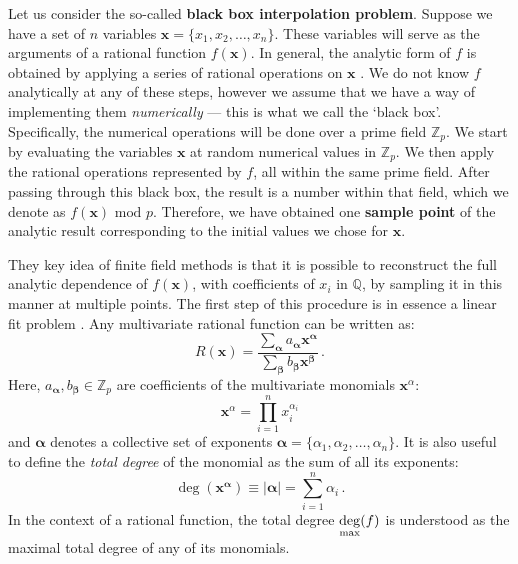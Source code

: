\documentclass[main.tex]{subfiles}
\begin{document}
Let us consider the so-called \textbf{black box interpolation problem}. Suppose we have a set of $n$ variables $\mathbf{x}=\{x_1, x_2, \ldots, x_n\}$. These variables will serve as the arguments of a rational function $f(\mathbf{x})$. In general, the analytic form of $f$ is obtained by applying a series of rational operations on $\mathbf{x}$ . We do not know $f$ analytically at any of these steps, however we assume that we have a way of implementing them \textit{numerically} --- this is what we call the `black box'. Specifically, the numerical operations will be done over a prime field $\mathbb{Z}_p$. We start by evaluating the variables $\mathbf{x}$ at random numerical values in $\mathbb{Z}_p$. We then apply the rational operations represented by $f$, all within the same prime field. After passing through this black box, the result is a number within that field, which we denote as $f(\mathbf{x}) \text{ mod } p$. Therefore, we have obtained one \textbf{sample point} of the analytic result corresponding to the initial values we chose for $\mathbf{x}$.

They key idea of finite field methods is that it is possible to reconstruct the full analytic dependence of $f(\mathbf{x})$, with coefficients of $x_i$ in $\mathbb{Q}$, by sampling it in this manner at multiple points. The first step of this procedure is in essence a linear fit problem . Any multivariate rational function can be written as:
\begin{equation} \label{eq:ratfun}
     R(\mathbf{x}) = \frac{
     \sum_{\bm{\alpha}} a_{\bm{\alpha}} \mathbf{x}^{\bm{\alpha}}
     }{
     \sum_{\bm{\beta}} b_{\bm{\beta}} \mathbf{x}^{\bm{\beta}}
     }\,.
\end{equation}
Here, $a_{\bm{\alpha}}, b_{\bm{\beta}} \in \mathbb{Z}_p$ are coefficients of the multivariate monomials $\mathbf{x}^\alpha$:
\begin{equation}
    \mathbf{x}^\alpha = \prod_{i=1}^n x_i^{\alpha_i}
\end{equation}
and $\bm{\alpha}$ denotes a collective set of exponents $\bm{\alpha} = \{\alpha_1, \alpha_2, \ldots, \alpha_n\}$. It is also useful to define the \textit{total degree} of the monomial as the sum of all its exponents:
\begin{equation}
    \deg (\mathbf{x}^{\bm{\alpha}}) \equiv |\bm{\alpha}| = \sum_{i=1}^n \alpha_i\,.
\end{equation}
In the context of a rational function, the total degree $\underset{\text{max}}{\deg}(f)$ is understood as the maximal total degree of any of its monomials.
\end{document}
